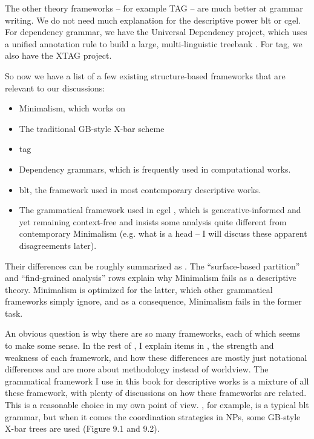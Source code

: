 \documentclass[../main.tex]{subfiles}
\begin{document}
The other theory frameworks -- for example TAG -- are much better at grammar writing. 
We do not need much explanation for the descriptive power \ac{blt} or \ac{cgel}. 
For dependency grammar, we have the Universal Dependency project, 
which uses a unified annotation rule to build a large, multi-linguistic treebank \citep{ud}.
For \ac{tag}, we also have the XTAG project. %

So now we have a list of a few existing structure-based frameworks that are relevant to our discussions:
\begin{itemize}
    \item Minimalism, which works on 
    \item The traditional GB-style X-bar scheme
    \item \ac{tag}  %
    \item Dependency grammars, which is frequently used in computational works.
    \item \ac{blt}, the framework used in most contemporary descriptive works.
    \item The grammatical framework used in \ac{cgel} \citep{cgel,pullum2008expressive}, which is generative-informed and yet remaining 
    context-free and insists some analysis quite different from contemporary Minimalism (e.g. 
    what is a head -- I will discuss these apparent disagreements later).
\end{itemize}
Their differences can be roughly summarized as . 
The ``surface-based partition'' and ``find-grained analysis'' rows 
explain why Minimalism fails as a descriptive theory. 
Minimalism is optimized for the latter, 
which other grammatical frameworks simply ignore, and as a consequence, 
Minimalism fails in the former task.

An obvious question is why there are so many frameworks, each of which seems to make some sense. 
In the rest of , 
I explain items in , 
the strength and weakness of each framework, 
and how these differences are mostly just notational differences 
and are more about methodology instead of worldview. 
The grammatical framework I use in this book for descriptive works is a mixture of all these framework,
with plenty of discussions on how these frameworks are related.
This is a reasonable choice in my own point of view. 
\citet{jacques2021grammar}, for example, is a typical \ac{blt} grammar, 
but when it comes the coordination strategies in NPs, 
some GB-style X-bar trees are used (Figure 9.1 and 9.2).
\end{document}
